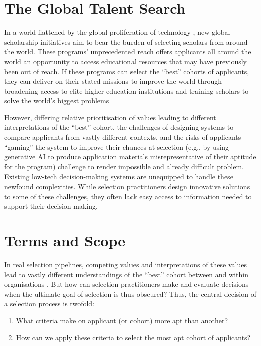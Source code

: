\section{The Global Talent Search}
In a world flattened by the global proliferation of technology \cite{Friedman_2005}, new global scholarship initiatives aim to bear the burden of selecting scholars from around the world. These programs' unprecedented reach offers applicants all around the world an opportunity to access educational resources that may have previously been out of reach. If these programs can select the ``best'' cohorts of applicants, they can deliver on their stated missions to improve the world through broadening access to elite higher education institutions and training scholars to solve the world's biggest problems

However, differing relative prioritisation of values leading to different interpretations of the ``best'' cohort, the challenges of designing systems to compare applicants from vastly different contexts, and the risks of applicants ``gaming'' the system to improve their chances at selection (e.g., by using generative AI to produce application materials misrepresentative of their aptitude for the program) challenge to render impossible and already difficult problem. Existing low-tech decision-making systems are unequipped to handle these newfound complexities. While selection practitioners design innovative solutions to some of these challenges, they often lack easy access to information needed to support their decision-making.

\section{Terms and Scope}

In real selection pipelines, competing values and interpretations of these values lead to vastly different understandings of the ``best'' cohort between and within organisations \cite{zimmerman_research_2014}. But how can selection practitioners make and evaluate decisions when the ultimate goal of selection is thus obscured? Thus, the central decision of a selection process is twofold: 

\begin{enumerate}
    \item What criteria make on applicant (or cohort) more apt than another?
    \item How can we apply these criteria to select the most apt cohort of applicants?
\end{enumerate}

